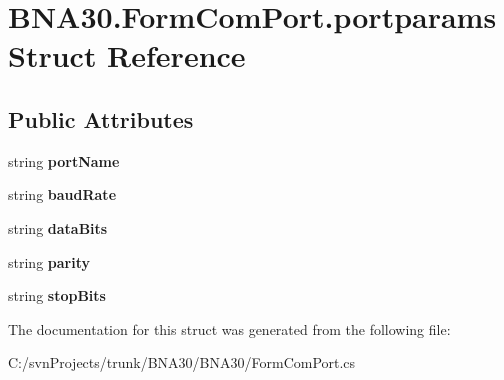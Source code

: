 \hypertarget{struct_b_n_a30_1_1_form_com_port_1_1portparams}{}\section{B\+N\+A30.\+Form\+Com\+Port.\+portparams Struct Reference}
\label{struct_b_n_a30_1_1_form_com_port_1_1portparams}
\subsection*{Public Attributes}
\begin{DoxyCompactItemize}
\item 
\mbox{\label{struct_b_n_a30_1_1_form_com_port_1_1portparams_a7e4f68cbe50ab2f2df563285ecab3a06}} 
string {\bfseries port\+Name}
\item 
\mbox{\label{struct_b_n_a30_1_1_form_com_port_1_1portparams_afd1c4aa0c9176f42e162e7ce62983907}} 
string {\bfseries baud\+Rate}
\item 
\mbox{\label{struct_b_n_a30_1_1_form_com_port_1_1portparams_ac172eafe9d43778bf929f75510da7ce3}} 
string {\bfseries data\+Bits}
\item 
\mbox{\label{struct_b_n_a30_1_1_form_com_port_1_1portparams_a1f2cf578e3f069ef5078f338dba264b5}} 
string {\bfseries parity}
\item 
\mbox{\label{struct_b_n_a30_1_1_form_com_port_1_1portparams_ac5fff7ea36b35ae498fc6ee7526301d9}} 
string {\bfseries stop\+Bits}
\end{DoxyCompactItemize}


The documentation for this struct was generated from the following file\+:\begin{DoxyCompactItemize}
\item 
C\+:/svn\+Projects/trunk/\+B\+N\+A30/\+B\+N\+A30/Form\+Com\+Port.\+cs\end{DoxyCompactItemize}
